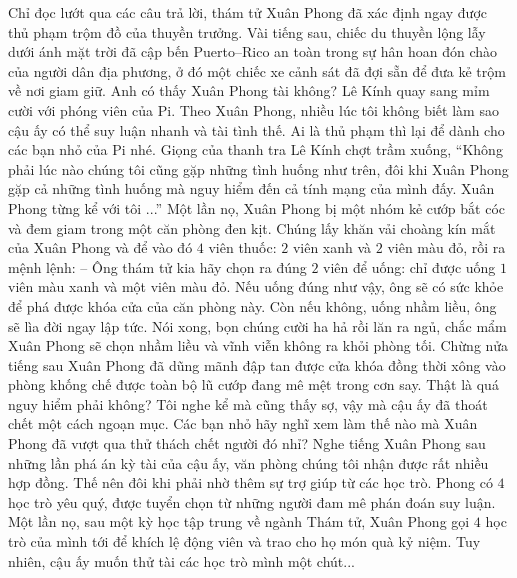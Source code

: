 	\vskip 0.1cm
	Chỉ đọc lướt qua các câu trả lời, thám tử Xuân Phong đã xác định ngay được thủ phạm trộm đồ của thuyền trưởng. Vài tiếng sau, chiếc du thuyền lộng lẫy dưới ánh mặt trời đã cập bến Puerto--Rico an toàn trong sự hân hoan đón chào của người dân địa phương, ở đó một chiếc xe cảnh sát đã đợi sẵn để đưa kẻ trộm về nơi giam giữ. 
	\vskip 0.1cm
	Anh có thấy Xuân Phong tài không? Lê Kính quay sang mỉm cười với phóng viên của Pi. Theo Xuân Phong, nhiều lúc tôi không biết làm sao cậu ấy có thể suy luận nhanh và tài tình thế. Ai là thủ phạm thì lại để dành cho các bạn nhỏ của Pi nhé.
	\vskip 0.1cm
	Giọng của thanh tra Lê Kính chợt trầm xuống, “Không phải lúc nào chúng tôi cũng gặp những tình huống như trên, đôi khi Xuân Phong gặp cả những tình huống mà nguy hiểm đến cả tính mạng của mình đấy. Xuân Phong từng kể với tôi ...”
	\vskip 0.1cm
	\textbf{\color{toancuabi}{THỬ THÁCH SỐNG CÒN}}
	\vskip 0.1cm 
	Một lần nọ, Xuân Phong bị một nhóm kẻ cướp bắt cóc và đem giam trong một căn phòng đen kịt. Chúng lấy khăn vải choàng kín mắt của Xuân Phong và để vào đó $4$ viên thuốc: $2$ viên xanh và $2$ viên màu đỏ, rồi ra mệnh lệnh:
	\vskip 0.1cm
	--	Ông thám tử kia hãy chọn ra đúng $2$ viên để uống: chỉ được uống $1$ viên màu xanh và một viên màu đỏ. Nếu uống đúng như vậy, ông sẽ có sức khỏe để phá được khóa cửa của căn phòng này. Còn nếu không, uống nhầm liều, ông sẽ lìa đời ngay lập tức. 
	\vskip 0.1cm
	Nói xong, bọn chúng cười ha hả rồi lăn ra ngủ, chắc mẩm Xuân Phong sẽ chọn nhầm liều và vĩnh viễn không ra khỏi phòng tối. Chừng nửa tiếng sau Xuân Phong đã dũng mãnh đập tan được cửa khóa đồng thời xông vào phòng khống chế được toàn bộ lũ cướp đang mê mệt trong cơn say. 
	\vskip 0.1cm
	Thật là quá nguy hiểm phải không? Tôi nghe kể mà cũng thấy sợ, vậy mà cậu ấy đã thoát chết một cách ngoạn mục. Các bạn nhỏ hãy nghĩ xem làm thế nào mà Xuân Phong đã vượt qua thử thách chết người đó nhỉ? 
	\vskip 0.1cm
	Nghe tiếng Xuân Phong sau những lần phá án kỳ tài của cậu ấy, văn phòng chúng tôi nhận được rất nhiều hợp đồng. Thế nên đôi khi phải nhờ thêm sự trợ giúp từ các học trò. Phong có $4$ học trò yêu quý, được tuyển chọn từ những người đam mê phán đoán suy luận. Một lần nọ, sau một kỳ học tập trung về ngành Thám tử, Xuân Phong gọi $4$ học trò của mình tới để khích lệ động viên và trao cho họ món quà kỷ niệm. Tuy nhiên, cậu ấy muốn thử tài các học trò mình một chút...
